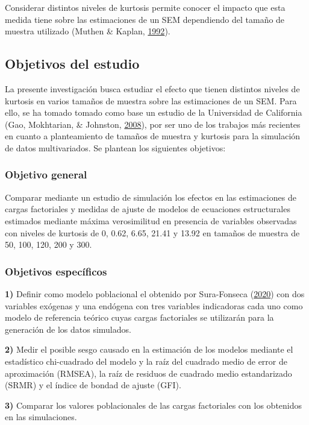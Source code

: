 \documentclass[
  english]{revcoles}
\begin{document}
Considerar distintos niveles de kurtosis permite conocer el impacto que
esta medida tiene sobre las estimaciones de un SEM dependiendo del
tamaño de muestra utilizado (Muthen \& Kaplan,
\protect\hyperlink{ref-Muthen1992}{1992}).

\subsection{Objetivos del estudio}

La presente investigación busca estudiar el efecto que tienen distintos
niveles de kurtosis en varios tamaños de muestra sobre las estimaciones
de un SEM. Para ello, se ha tomado tomado como base un estudio de la
Universidad de California (Gao, Mokhtarian, \& Johnston,
\protect\hyperlink{ref-Gao2008}{2008}), por ser uno de los trabajos más
recientes en cuanto a planteamiento de tamaños de muestra y kurtosis
para la simulación de datos multivariados. Se plantean los siguientes
objetivos:

\subsubsection{Objetivo general}

Comparar mediante un estudio de simulación los efectos en las
estimaciones de cargas factoriales y medidas de ajuste de modelos de
ecuaciones estructurales estimados mediante máxima verosimilitud en
presencia de variables observadas con niveles de kurtosis de 0, 0.62,
6.65, 21.41 y 13.92 en tamaños de muestra de 50, 100, 120, 200 y 300.

\subsubsection{Objetivos específicos}

\textbf{1)} Definir como modelo poblacional el obtenido por Sura-Fonseca
(\protect\hyperlink{ref-SuraFonseca2020}{2020}) con dos variables
exógenas y una endógena con tres variables indicadoras cada uno como
modelo de referencia teórico cuyas cargas factoriales se utilizarán para
la generación de los datos simulados.

\textbf{2)} Medir el posible sesgo causado en la estimación de los
modelos mediante el estadístico chi-cuadrado del modelo y la raíz del
cuadrado medio de error de aproximación (RMSEA), la raíz de residuos de
cuadrado medio estandarizado (SRMR) y el índice de bondad de ajuste
(GFI).

\textbf{3)} Comparar los valores poblacionales de las cargas factoriales
con los obtenidos en las simulaciones.
\end{document}
